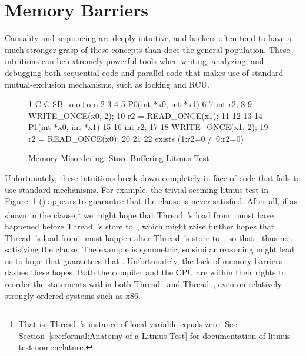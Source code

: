 
\section{Memory Barriers}
\label{sec:advsync:Memory Barriers}

Causality and sequencing are deeply intuitive, and hackers often
tend to have a much stronger grasp of these concepts than does
the general population.
These intuitions can be extremely powerful tools when writing, analyzing,
and debugging both sequential code and parallel code that makes
use of standard mutual-exclusion mechanisms, such as locking and
RCU.

\begin{figure}
{ \scriptsize
\begin{verbbox}
 1 C C-SB+o-o+o-o
 2 {
 3 }
 4
 5 P0(int *x0, int *x1)
 6 {
 7   int r2;
 8
 9   WRITE_ONCE(x0, 2);
10   r2 = READ_ONCE(x1);
11 }
12
13
14 P1(int *x0, int *x1)
15 {
16   int r2;
17
18   WRITE_ONCE(x1, 2);
19   r2 = READ_ONCE(x0);
20 }
21
22 exists (1:r2=0 /\ 0:r2=0)
\end{verbbox}
}
\centering
\theverbbox
\caption{Memory Misordering: Store-Buffering Litmus Test}
\label{fig:advsync:Memory Misordering: Store-Buffering Litmus Test}
\end{figure}

Unfortunately, these intuitions break down completely in face of
code that fails to use standard mechanisms.
For example, the trivial-seeming litmus test in
Figure~\ref{fig:advsync:Memory Misordering: Store-Buffering Litmus Test}
()
appears to guarantee that the  clause is never satisfied.
After all, if  as shown in the  clause,\footnote{
	That is, Thread~'s instance of local variable 
	equals zero.
	See Section~\ref{sec:formal:Anatomy of a Litmus Test}
	for documentation of litmus-test nomenclature.}
we might hope that Thread~'s
load from~ must have happened before Thread~'s store to~,
which might raise
further hopes that Thread~'s load from~ must happen after
Thread~'s store to~, so that ,
thus not satisfying the  clause.
The example is symmetric, so similar reasoning might lead
us to hope that  guarantees that .
Unfortunately, the lack of memory barriers dashes these hopes.
Both the compiler and the CPU are within their rights to reorder
the statements within both Thread~ and Thread~,
even on relatively strongly ordered systems such as x86.

